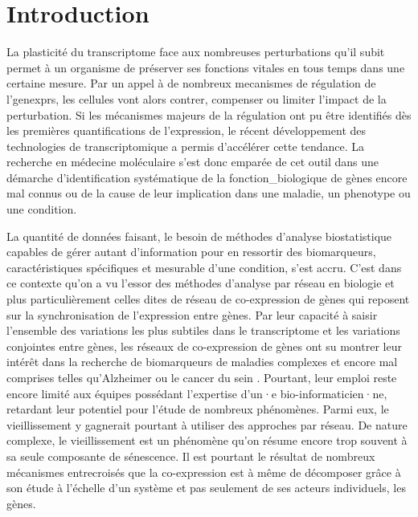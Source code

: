 \setcounter{chapter}{1}         %
\setcounter{section}{0}
\chapter*{Introduction}         %
\label{chapter:intro}

La plasticité du \gls{transcriptome} face aux nombreuses perturbations qu'il subit permet à un \gls{organisme} de préserver ses fonctions vitales en tous temps dans une certaine mesure. Par un appel à de nombreux \glspl{mecanisme} de régulation de l'\glspl{genexpr}, les cellules vont alors contrer, compenser ou limiter l'impact de la perturbation. Si les mécanismes majeurs de la régulation ont pu être identifiés dès les premières quantifications de l'expression, le récent développement des technologies de \gls{transcriptomique} a permis d'accélérer cette tendance. La recherche en médecine moléculaire s'est donc emparée de cet outil dans une démarche d'identification systématique de la \gls{fonction_biologique} de gènes encore mal connus ou de la cause de leur implication dans une maladie, un \gls{phenotype} ou une \gls{condition}.

La quantité de données faisant, le besoin de méthodes d'analyse biostatistique capables de gérer autant d'information pour en ressortir des biomarqueurs, caractéristiques spécifiques et mesurable d'une condition, s'est accru. C'est dans ce contexte qu'on a vu l’essor des méthodes d'analyse par réseau en biologie \cite{Barabasi2004} et plus particulièrement celles dites de réseau de co-expression de gènes qui reposent sur la synchronisation de l'expression entre gènes. Par leur capacité à saisir l'ensemble des variations les plus subtiles dans le \gls{transcriptome} et les variations conjointes entre gènes, les réseaux de co-expression de gènes ont su montrer leur intérêt dans la recherche de biomarqueurs de maladies complexes et encore mal comprises telles qu'Alzheimer \cite{Hu2020Nov} ou le cancer du sein \cite{Garcia-Cortes2020Jul}. Pourtant, leur emploi reste encore limité aux équipes possédant l'expertise d'un·e bio-informaticien·ne, retardant leur potentiel pour l'étude de nombreux phénomènes. Parmi eux, le vieillissement y gagnerait pourtant à utiliser des approches par réseau. De nature complexe, le vieillissement est un phénomène qu'on résume encore trop souvent à sa seule composante de sénescence. Il est pourtant le résultat de nombreux mécanismes entrecroisés que la co-expression est à même de décomposer grâce à son étude à l'échelle d'un système et pas seulement de ses acteurs individuels, les gènes.

